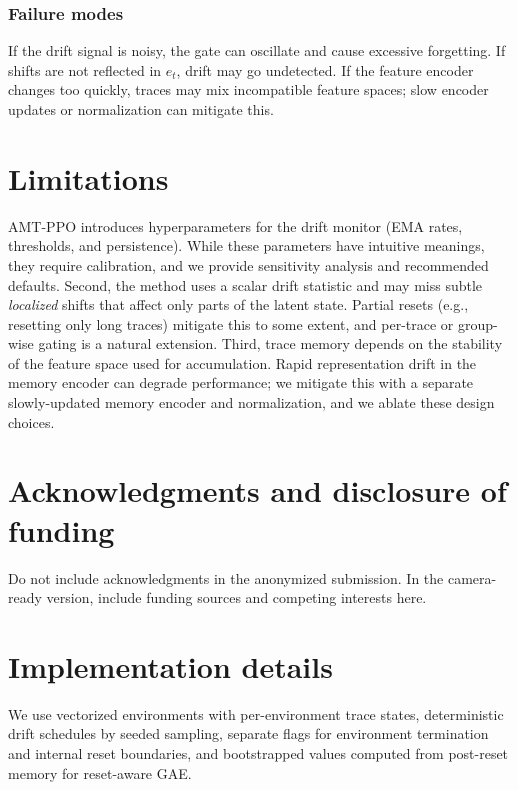 \documentclass{article}
\begin{document}
\subsubsection*{Failure modes}
If the drift signal is noisy, the gate can oscillate and cause excessive forgetting. If shifts are not reflected in $e_t$, drift may go undetected. If the feature encoder changes too quickly, traces may mix incompatible feature spaces; slow encoder updates or normalization can mitigate this.

\section{Limitations}
AMT-PPO introduces hyperparameters for the drift monitor (EMA rates, thresholds, and persistence). While these parameters have intuitive meanings, they require calibration, and we provide sensitivity analysis and recommended defaults.
Second, the method uses a scalar drift statistic and may miss subtle \emph{localized} shifts that affect only parts of the latent state. Partial resets (e.g., resetting only long traces) mitigate this to some extent, and per-trace or group-wise gating is a natural extension.
Third, trace memory depends on the stability of the feature space used for accumulation. Rapid representation drift in the memory encoder can degrade performance; we mitigate this with a separate slowly-updated memory encoder and normalization, and we ablate these design choices.


\section*{Acknowledgments and disclosure of funding}
\begin{ack}
Do not include acknowledgments in the anonymized submission. In the camera-ready version, include funding sources and competing interests here.
\end{ack}




\appendix

\section{Implementation details}
We use vectorized environments with per-environment trace states, deterministic drift schedules by seeded sampling, separate flags for environment termination and internal reset boundaries, and bootstrapped values computed from post-reset memory for reset-aware GAE.
\end{document}
